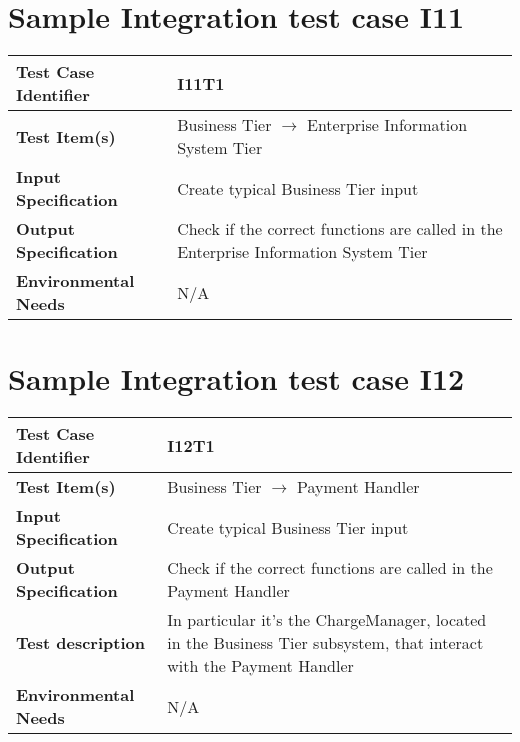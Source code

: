 \section{Sample Integration test case I11}\label{I11}
\begin{center}
	\vspace{0.6cm}
	\begin{tabular}{|l|l|}
		\hline
		\textbf{Test Case Identifier} & I11T1 \bigstrut \\\hline
		\textbf{Test Item(s)} & Business Tier \ensuremath{\rightarrow} Enterprise Information System Tier \bigstrut \\\hline
		\textbf{Input Specification} & Create typical Business Tier input \bigstrut \\\hline
		\textbf{Output Specification} & Check if the correct functions are called in the Enterprise Information System Tier \bigstrut \\\hline
		\textbf{Environmental Needs} & N/A \bigstrut \\\hline
	\end{tabular}
\end{center}

\section{Sample Integration test case I12}\label{I12}
\begin{center}
	\vspace{0.6cm}
	\begin{tabular}{|l|l|}
		\hline
		\textbf{Test Case Identifier} & I12T1 \bigstrut \\\hline
		\textbf{Test Item(s)} & Business Tier \ensuremath{\rightarrow} Payment Handler \bigstrut \\\hline
		\textbf{Input Specification} & Create typical Business Tier input \bigstrut \\\hline
		\textbf{Output Specification} & Check if the correct functions are called in the Payment Handler \bigstrut \\\hline
		\textbf{Test description} & In particular it's the ChargeManager, located in the Business Tier subsystem, that interact with the Payment Handler \bigstrut \\\hline
		\textbf{Environmental Needs} & N/A \bigstrut \\\hline
	\end{tabular}
\end{center}


